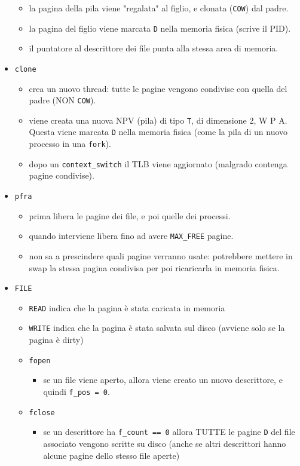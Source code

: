 \documentclass[12pt, a4paper]{report}
\begin{document}
\begin{itemize}
\begin{itemize}
		      \item la pagina della pila viene "regalata" al figlio, e clonata
		            (\texttt{COW}) dal padre.
		      \item la pagina del figlio viene marcata \texttt{D} nella memoria
		            fisica (scrive il PID).
		      \item il puntatore al descrittore dei file punta alla stessa area di
		            memoria.
	      \end{itemize}
	\item \texttt{clone}
	      \begin{itemize}
		      \item crea un nuovo thread: tutte le pagine vengono condivise con
		            quella del padre (NON \texttt{COW}).
		      \item viene creata una nuova NPV (pila) di tipo \texttt{T}, di
		            dimensione 2, W P A. Questa viene marcata \texttt{D} nella
		            memoria fisica (come la pila di un nuovo processo in una
		            \texttt{fork}).
		      \item dopo un \texttt{context\_switch} il TLB viene aggiornato
		            (malgrado contenga pagine condivise).
	      \end{itemize}
	\item \texttt{pfra}
	      \begin{itemize}
		      \item prima libera le pagine dei file, e poi quelle dei processi.
		      \item quando interviene libera fino ad avere \texttt{MAX\_FREE}
		            pagine. \item non sa a prescindere quali pagine verranno
		            usate: potrebbere
		            mettere in swap la stessa pagina condivisa per poi ricaricarla
		            in memoria fisica.
	      \end{itemize}
	\item \texttt{FILE}
	      \begin{itemize}
		      \item \texttt{READ} indica che la pagina è stata caricata in
		            memoria
		      \item \texttt{WRITE} indica che la pagina è stata salvata sul disco
		            (avviene solo se la pagina è dirty)
	\item \texttt{fopen}
	      \begin{itemize}
		      \item se un file viene aperto, allora viene creato un nuovo
		            descrittore, e quindi \texttt{f\_pos = 0}.
	      \end{itemize}
	\item \texttt{fclose}
	      \begin{itemize}
		      \item se un descrittore ha \texttt{f\_count == 0} allora TUTTE le
				  pagine \texttt{D} del file associato vengono scritte su disco
				  (anche se altri descrittori hanno alcune pagine dello stesso
				  file aperte)
	      \end{itemize}
\end{itemize}


\end{itemize}
\end{document}
